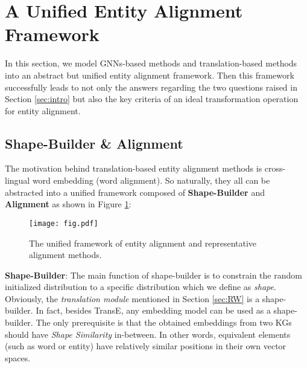 \documentclass[sigconf,camera-ready]{acmart}
\begin{document}
\section{A Unified Entity Alignment Framework}
\label{sec:transformation}
In this section, we model GNNs-based methods and translation-based methods into an abstract but unified entity alignment framework.
Then this framework successfully leads to not only the answers regarding the two questions raised in Section \ref{sec:intro} but also the key criteria of an ideal transformation operation for entity alignment.

\subsection{Shape-Builder \& Alignment}
\label{4.1}
The motivation behind translation-based entity alignment methods is cross-lingual word embedding (word alignment).
So naturally, they all can be abstracted into a unified framework composed of \textbf{Shape-Builder} and \textbf{Alignment} as shown in Figure \ref{fig:1}:
\begin{figure}[t]
  \centering
\texttt{[image: fig.pdf]}\\
  \caption{The unified framework of entity alignment and representative alignment methods.
}\label{fig:1}
\end{figure}

\textbf{Shape-Builder}:
The main function of shape-builder is to constrain the random initialized distribution to a specific distribution which we define as \emph{shape}.
Obviously, the \emph{translation module} mentioned in Section \ref{sec:RW} is a shape-builder.
In fact, besides TransE, any embedding model can be used as a shape-builder.
The only prerequisite is that the obtained embeddings from two KGs should have \emph{Shape Similarity} in-between. 
In other words, equivalent elements (such as word or entity) have relatively similar positions in their own vector spaces.
\end{document}
